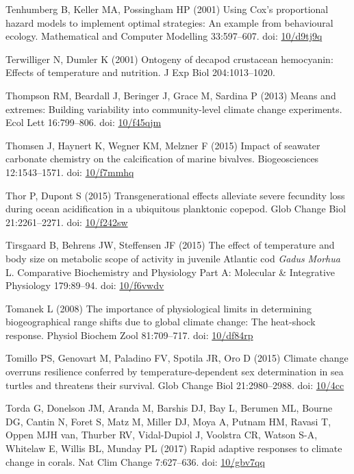 \documentclass[a4paper,10pt, oneside]{memoir}
\begin{document}
\leavevmode\hypertarget{ref-Tenhumberg2001}{}%
Tenhumberg B, Keller MA, Possingham HP (2001) Using Cox's proportional hazard models to implement optimal strategies: An example from behavioural ecology. Mathematical and Computer Modelling 33:597--607. doi: \href{https://doi.org/10/d9tj9q}{10/d9tj9q}

\leavevmode\hypertarget{ref-Terwilliger2001}{}%
Terwilliger N, Dumler K (2001) Ontogeny of decapod crustacean hemocyanin: Effects of temperature and nutrition. J Exp Biol 204:1013--1020.

\leavevmode\hypertarget{ref-Thompson2013}{}%
Thompson RM, Beardall J, Beringer J, Grace M, Sardina P (2013) Means and extremes: Building variability into community-level climate change experiments. Ecol Lett 16:799--806. doi: \href{https://doi.org/10/f45qjm}{10/f45qjm}

\leavevmode\hypertarget{ref-Thomsen2015}{}%
Thomsen J, Haynert K, Wegner KM, Melzner F (2015) Impact of seawater carbonate chemistry on the calcification of marine bivalves. Biogeosciences 12:1543--1571. doi: \href{https://doi.org/10/f7mmhq}{10/f7mmhq}

\leavevmode\hypertarget{ref-Thor2015}{}%
Thor P, Dupont S (2015) Transgenerational effects alleviate severe fecundity loss during ocean acidification in a ubiquitous planktonic copepod. Glob Change Biol 21:2261--2271. doi: \href{https://doi.org/10/f242sw}{10/f242sw}

\leavevmode\hypertarget{ref-Tirsgaard2015}{}%
Tirsgaard B, Behrens JW, Steffensen JF (2015) The effect of temperature and body size on metabolic scope of activity in juvenile Atlantic cod \emph{Gadus} \emph{Morhua} L. Comparative Biochemistry and Physiology Part A: Molecular \& Integrative Physiology 179:89--94. doi: \href{https://doi.org/10/f6vwdv}{10/f6vwdv}

\leavevmode\hypertarget{ref-Tomanek2008}{}%
Tomanek L (2008) The importance of physiological limits in determining biogeographical range shifts due to global climate change: The heat-shock response. Physiol Biochem Zool 81:709--717. doi: \href{https://doi.org/10/df84rp}{10/df84rp}

\leavevmode\hypertarget{ref-Tomillo2015}{}%
Tomillo PS, Genovart M, Paladino FV, Spotila JR, Oro D (2015) Climate change overruns resilience conferred by temperature-dependent sex determination in sea turtles and threatens their survival. Glob Change Biol 21:2980--2988. doi: \href{https://doi.org/10/4cc}{10/4cc}

\leavevmode\hypertarget{ref-Torda2017}{}%
Torda G, Donelson JM, Aranda M, Barshis DJ, Bay L, Berumen ML, Bourne DG, Cantin N, Foret S, Matz M, Miller DJ, Moya A, Putnam HM, Ravasi T, Oppen MJH van, Thurber RV, Vidal-Dupiol J, Voolstra CR, Watson S-A, Whitelaw E, Willis BL, Munday PL (2017) Rapid adaptive responses to climate change in corals. Nat Clim Change 7:627--636. doi: \href{https://doi.org/10/gbv7qq}{10/gbv7qq}
\end{document}
